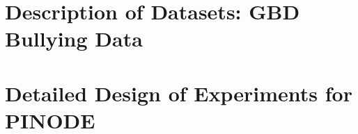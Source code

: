 \documentclass[12pt,a4paper]{book}
\numberwithin{equation}{section} %
\numberwithin{figure}{section} %
\numberwithin{table}{section} %
\begin{document}
\section{Description of Datasets: GBD Bullying Data}


%
%

\section{Detailed Design of Experiments for PINODE}

\end{document}
